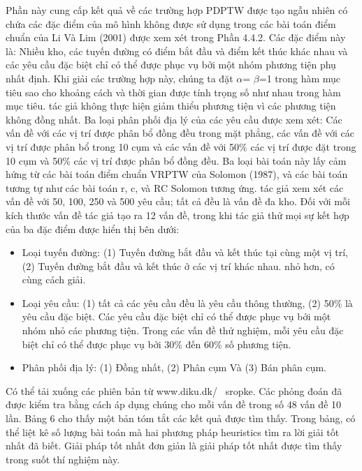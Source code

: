 Phần này cung cấp kết quả về các trường hợp PDPTW được tạo ngẫu nhiên có chứa các đặc điểm của mô hình không được sử dụng trong các bài toán điểm chuẩn của Li Và Lim (2001) được xem xét trong Phần 4.4.2. Các đặc điểm này là: Nhiều kho, các tuyến đường có điểm bắt đầu và điểm kết thúc khác nhau và các yêu cầu đặc biệt chỉ có thể được phục vụ bởi một nhóm phương tiện phụ nhất định. Khi giải các trường hợp này, chúng ta đặt $\alpha$= $\beta$=1 trong hàm mục tiêu sao cho khoảng cách và thời gian được tính trọng số như nhau trong hàm mục tiêu. tác giả không thực hiện giảm thiểu phương tiện vì các phương tiện không đồng nhất. 
Ba loại phân phối địa lý của các yêu cầu được xem xét: Các vấn đề với các vị trí được phân bổ đồng đều trong mặt phẳng, các vấn đề với các vị trí được phân bổ trong 10 cụm và các vấn đề với 50\% các vị trí được đặt trong 10 cụm và 50\% các vị trí được phân bổ đồng đều. Ba loại bài toán này lấy cảm hứng từ các bài toán điểm chuẩn VRPTW của Solomon (1987), và các bài toán tương tự như các bài toán r, c, và RC Solomon tương ứng. tác giả xem xét các vấn đề với 50, 100, 250 và 500 yêu cầu; tất cả đều là vấn đề đa kho. Đối với mỗi kích thước vấn đề tác giả tạo ra 12 vấn đề, trong khi tác giả thử mọi sự kết hợp của ba đặc điểm được hiển thị bên dưới:
\begin{itemize}
    \item Loại tuyến đường: (1) Tuyến đường bắt đầu và kết thúc tại cùng một vị trí, (2) Tuyến đường bắt đầu và kết thúc ở các vị trí khác nhau.
    nhỏ hơn, có cùng cách giải.
    \item Loại yêu cầu: (1) tất cả các yêu cầu đều là yêu cầu thông thường, (2) 50\% là yêu cầu đặc biệt. Các yêu cầu đặc biệt chỉ có thể được phục vụ bởi một nhóm nhỏ các phương tiện. Trong các vấn đề thử nghiệm, mỗi yêu cầu đặc biệt chỉ có thể được phục vụ bởi 30\% đến 60\% số phương tiện.
    \item Phân phối địa lý: (1) Đồng nhất, (2) Phân cụm Và (3) Bán phân cụm.
\end{itemize}
Có thể tải xuống các phiên bản từ www.diku.dk/ ~sropke. Các phỏng đoán đã được kiểm tra bằng cách áp dụng chúng cho mỗi vấn đề trong số 48 vấn đề 10 lần. Bảng 6 cho thấy một bản tóm tắt các kết quả được tìm thấy. Trong bảng, có thể liệt kê số lượng bài toán mà hai phương pháp heuristics tìm ra lời giải tốt nhất đã biết. Giải pháp tốt nhất đơn giản là giải pháp tốt nhất được tìm thấy trong suốt thí nghiệm này.

